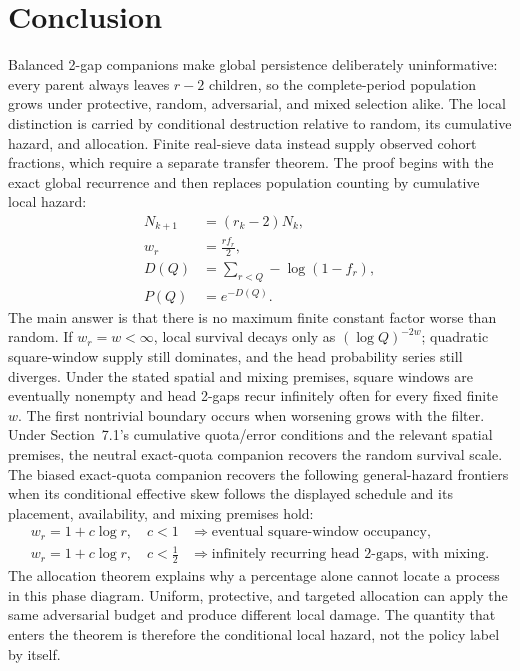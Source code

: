 \section{Conclusion}
Balanced 2-gap companions make global persistence deliberately uninformative: every parent always leaves $r-2$ children, so the complete-period population grows under protective, random, adversarial, and mixed selection alike. The local distinction is carried by conditional destruction relative to random, its cumulative hazard, and allocation. Finite real-sieve data instead supply observed cohort fractions, which require a separate transfer theorem.
The proof begins with the exact global recurrence and then replaces population counting by cumulative local hazard:
\begin{equation*}
\begin{aligned}
N_{k+1}&=(r_k-2)N_k,\\
w_r&=\frac{rf_r}{2},\\
D(Q)&=\sum_{r < Q}-\log(1-f_r),\\
P(Q)&=e^{-D(Q)}.
\end{aligned}
\end{equation*}
The main answer is that there is no maximum finite constant factor worse than random. If $w_r=w < \infty$, local survival decays only as $(\log Q)^{-2w}$; quadratic square-window supply still dominates, and the head probability series still diverges. Under the stated spatial and mixing premises, square windows are eventually nonempty and head 2-gaps recur infinitely often for every fixed finite $w$.
The first nontrivial boundary occurs when worsening grows with the filter. Under Section~7.1's cumulative quota/error conditions and the relevant spatial premises, the neutral exact-quota companion recovers the random survival scale. The biased exact-quota companion recovers the following general-hazard frontiers when its conditional effective skew follows the displayed schedule and its placement, availability, and mixing premises hold:
\begin{equation*}
\begin{aligned}
w_r=1+c\log r,\quad c < 1
&\Longrightarrow
\text{eventual square-window occupancy},\\
w_r=1+c\log r,\quad c < \frac12
&\Longrightarrow
\text{infinitely recurring head 2-gaps, with mixing}.
\end{aligned}
\end{equation*}
The allocation theorem explains why a percentage alone cannot locate a process in this phase diagram. Uniform, protective, and targeted allocation can apply the same adversarial budget and produce different local damage. The quantity that enters the theorem is therefore the conditional local hazard, not the policy label by itself.
